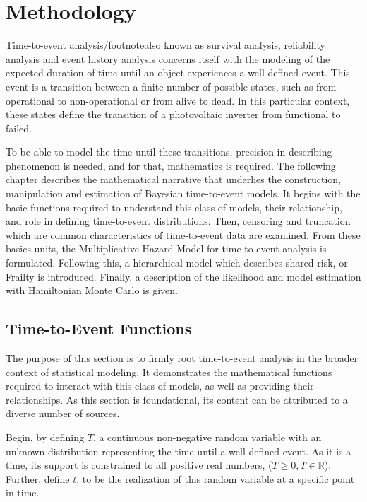 \chapter*{Methodology}
\thispagestyle{empty}

Time-to-event analysis/footnote{also known as survival analysis, reliability analysis and event history analysis} concerns itself with the modeling of the expected duration of time until an object experiences a well-defined event. This event is a transition between a finite number of possible states, such as from operational to non-operational or from alive to dead\cite{Andersen1992}. In this particular context, these states define the transition of a photovoltaic inverter from functional to failed.

To be able to model the time until these transitions, precision in describing phenomenon is needed, and for that, mathematics is required. The following chapter describes the mathematical narrative that underlies the construction, manipulation and estimation of Bayesian time-to-event models. It begins with the basic functions required to understand this class of models, their relationship, and role in defining time-to-event distributions. Then, censoring and truncation which are common characteristics of time-to-event data are examined. From these basics units, the Multiplicative Hazard Model for time-to-event analysis is formulated. Following this, a hierarchical model which describes shared risk, or Frailty is introduced. Finally, a description of the likelihood and model estimation with Hamiltonian Monte Carlo is given.



\section*{Time-to-Event Functions}

The purpose of this section is to firmly root time-to-event analysis in the broader context of statistical modeling. It demonstrates the mathematical functions required to interact with this class of models, as well as providing their relationships. As this section is foundational, its content can be attributed to a diverse number of sources\cite{Aalen2008}\cite{Tableman2004}\cite{Klein2003}\cite{Kleinbaum2005}\cite{Cleves2008}\cite{Rodriguez2007}.

Begin, by defining $T$, a continuous non-negative random variable with an unknown distribution representing the time until a well-defined event. As it is a time, its support is constrained to all positive real numbers, ($T \ge 0, T \in \mathbb{R}$). Further, define $t$, to be the realization of this random variable at a specific point in time.

